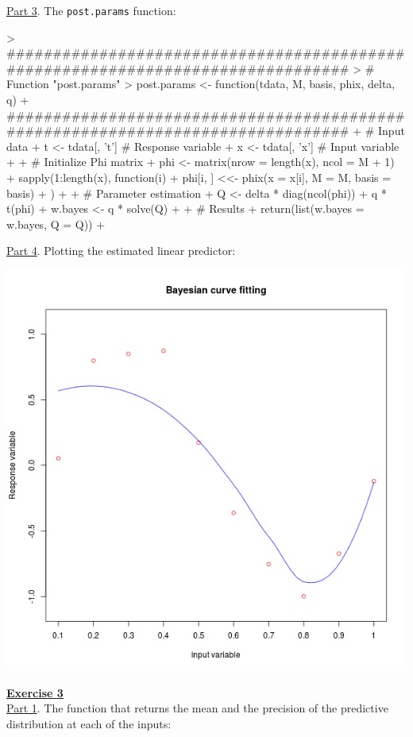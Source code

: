 \documentclass[a4paper, 11pt]{article}
\begin{document}
\underline{Part 3}. The \texttt{post.params} function:
\begin{Schunk}
\begin{Sinput}
> ################################################################################
> # Function "post.params"
> post.params <- function(tdata, M, basis, phix, delta, q) {
+ ################################################################################
+   # Input data
+   t <- tdata[, 't']  # Response variable
+   x <- tdata[, 'x']  # Input variable
+   
+   # Initialize Phi matrix
+   phi <- matrix(nrow = length(x), ncol = M + 1)
+   sapply(1:length(x), function(i) {
+     phi[i, ] <<- phix(x = x[i], M = M, basis = basis)
+   })
+ 
+   # Parameter estimation
+   Q <- delta * diag(ncol(phi)) + q * t(phi) %
+   w.bayes <- q * solve(Q) %
+     
+   # Results
+   return(list(w.bayes = w.bayes, Q = Q))
+ }
\end{Sinput}
\end{Schunk}
\underline{Part 4}. Plotting the estimated linear predictor:
\begin{center}
\includegraphics[scale = 0.5]{ps2_plot2.png}
\end{center}
\newpage
\textbf{\underline{Exercise 3}}\\
\newline \underline{Part 1}. The function that returns the mean and the precision of the predictive distribution at each of the inputs:
\end{document}
